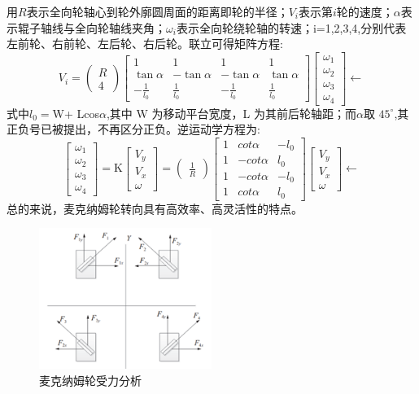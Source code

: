 \documentclass{report}
\begin{document}
用$R$表示全向轮轴心到轮外廓圆周面的距离即轮的半径；$V_i$表示第$i$轮的速度；$\alpha$表示辊子轴线与全向轮轴线夹角；$\omega_i$表示全向轮绕轮轴的转速；i=1,2,3,4,分别代表左前轮、右前轮、左后轮、右后轮。联立可得矩阵方程:
\[ V_i=\begin{pmatrix}R\\4\end{pmatrix}\begin{bmatrix}1&1&1&1\\\tan\alpha&-\tan\alpha&-\tan\alpha&\tan\alpha\\-\frac{1}{l_0}&\frac{1}{l_0}&-\frac{1}{l_0}&\frac{1}{l_0}\end{bmatrix}\begin{bmatrix}\omega_1\\\omega_2\\\omega_3\\\omega_4\end{bmatrix}\leftarrow  \]
式中$l_0=$W+ Lcos$\alpha$,其中 W 为移动平台宽度，L 为其前后轮轴距；而$\alpha$取
$45^{\circ}$,其正负号已被提出，不再区分正负。逆运动学方程为:
\[\begin{bmatrix}\omega_1\\\omega_2\\\omega_3\\\omega_4\end{bmatrix}=\text{K}\begin{bmatrix}V_y\\V_x\\\omega\end{bmatrix}=\begin{pmatrix}\frac{1}{R}\end{pmatrix}\begin{bmatrix}1&cot\alpha&-l_0\\1&-cot\alpha&l_0\\1&-cot\alpha&-l_0\\1&cot\alpha&l_0\end{bmatrix}\begin{bmatrix}V_y\\V_x\\\omega\end{bmatrix}\leftarrow \]
总的来说，麦克纳姆轮转向具有高效率、高灵活性的特点。
\begin{figure}[ht]
  \centering
  \includegraphics[width=0.5\textwidth]{figures/mac.png}
  \caption{麦克纳姆轮受力分析 }
\end{figure}
\end{document}
